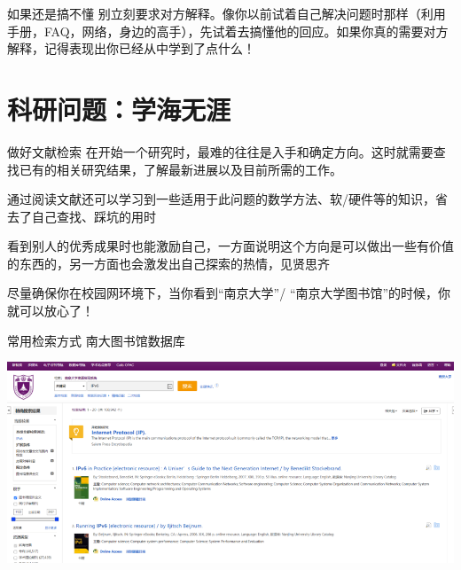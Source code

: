 \documentclass[10pt]{beamer}
\begin{document}
\begin{frame}[fragile]{如果还是搞不懂}
    别立刻要求对方解释。像你以前试着自己解决问题时那样（利用手册，FAQ，网络，身边的高手），先试着去搞懂他的回应。如果你真的需要对方解释，记得表现出你已经从中学到了点什么！
\end{frame}

\section{科研问题：学海无涯}

\begin{frame}[fragile]{做好文献检索}
    在开始一个研究时，最难的往往是入手和确定方向。这时就需要查找已有的相关研究结果，了解最新进展以及目前所需的工作。

    通过阅读文献还可以学习到一些适用于此问题的数学方法、软/硬件等的知识，省去了自己查找、踩坑的用时

    看到别人的优秀成果时也能激励自己，一方面说明这个方向是可以做出一些有价值的东西的，另一方面也会激发出自己探索的热情，见贤思齐

    尽量确保你在校园网环境下，当你看到“南京大学”/ “南京大学图书馆”的时候，你就可以放心了！
\end{frame}

\begin{frame}[fragile]{常用检索方式}
    南大图书馆数据库

    \includegraphics[width=\textwidth]{pic/NJU-library.png}
\end{frame}
\end{document}
